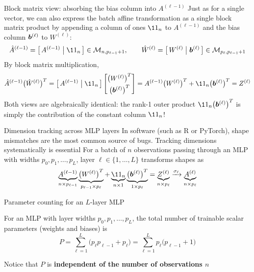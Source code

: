 \documentclass[aspectratio=169]{beamer}\usepackage[]{graphicx}\usepackage[]{xcolor}
\begin{document}
\begin{frame}{Block matrix view: absorbing the bias column into $A^{(\ell-1)}$}
Just as for a single vector, we can also express the batch affine transformation as a single block matrix product by appending a column of ones $\11_n$ to $A^{(\ell-1)}$ and the bias column $\bm{b}^{(\ell)}$ to $W^{(\ell)}$:
\[
\hat{A}^{(\ell-1)} = \big[\, A^{(\ell-1)} \;\big|\; \11_n \,\big] \in \M_{n, p_{\ell-1}+1}, \qquad
\hat{W}^{(\ell)} = \big[\, W^{(\ell)} \;\big|\; \bb^{(\ell)} \,\big] \in \M_{p_\ell, p_{\ell-1}+1}
\]
\vfill
By block matrix multiplication,
\[
\hat{A}^{(\ell-1)} \big(\hat{W}^{(\ell)}\big)^T
=
\big[\, A^{(\ell-1)} \;\big|\; \11_n \,\big]
\begin{bmatrix} \big(W^{(\ell)}\big)^T \\[3pt] \big(\bb^{(\ell)}\big)^T \end{bmatrix}
=
A^{(\ell-1)} \big(W^{(\ell)}\big)^T + \11_n \big(\bb^{(\ell)}\big)^T = Z^{(\ell)}
\]
\vfill
Both views are algebraically identical: the rank-1 outer product $\11_n \big(\bb^{(\ell)}\big)^T$ is simply the contribution of the constant column $\11_n$!
\end{frame}


\begin{frame}{Dimension tracking across MLP layers}
In software (such as R or PyTorch), shape mismatches are the most common source of bugs.
Tracking dimensions systematically is essential
\vfill
For a batch of $n$ observations passing through an MLP with widths $p_0, p_1, \ldots, p_L$, layer $\ell \in \{1, \ldots, L\}$ transforms shapes as
\[
\underbrace{A^{(\ell-1)}}_{n \times p_{\ell-1}}
\underbrace{\big(W^{(\ell)}\big)^T}_{p_{\ell-1} \times p_\ell}
+
\underbrace{\11_n}_{n \times 1}
\underbrace{\big(\bb^{(\ell)}\big)^T}_{1 \times p_\ell}
=
\underbrace{Z^{(\ell)}}_{n \times p_\ell}
\xrightarrow{\sigma_\ell}
\underbrace{A^{(\ell)}}_{n \times p_\ell}
\]
\end{frame}


\begin{frame}{Parameter counting for an $L$-layer MLP}
\begin{proposition}
For an MLP with layer widths $p_0, p_1, \ldots, p_L$, the total number of trainable scalar parameters (weights and biases) is
\[
P = \sum_{\ell=1}^L \big(p_\ell p_{\ell-1} + p_\ell\big) = \sum_{\ell=1}^L p_\ell\big(p_{\ell-1} + 1\big)
\]
\end{proposition}
\vfill
Notice that $P$ is \textbf{independent of the number of observations $n$}
\end{frame}
\end{document}
